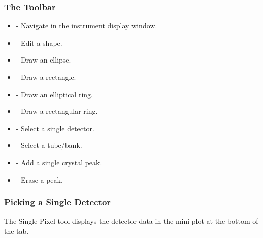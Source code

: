 \documentclass[letterpaper,10pt,english,openany]{sphinxmanual}
\begin{document}
\subsubsection{The Toolbar}
\label{\detokenize{mantid_basic_course/connecting_data_to_instruments/03_investigating_data:the-toolbar}}
\begin{DUlineblock}{0em}
\item[] 
\end{DUlineblock}
\begin{itemize}
\item {} 
 - Navigate in the instrument display window.

\item {} 
 - Edit a shape.

\item {} 
 - Draw an ellipse.

\item {} 
 - Draw a rectangle.

\item {} 
 - Draw an elliptical ring.

\item {} 
 - Draw a rectangular ring.

\item {} 
 - Select a single detector.

\item {} 
 - Select a tube/bank.

\item {} 
 - Add a single crystal peak.

\item {} 
 - Erase a peak.

\end{itemize}


\subsubsection{Picking a Single Detector}
\label{\detokenize{mantid_basic_course/connecting_data_to_instruments/03_investigating_data:picking-a-single-detector}}
The Single Pixel tool  displays the detector
data in the mini-plot at the bottom of the tab.
\end{document}
